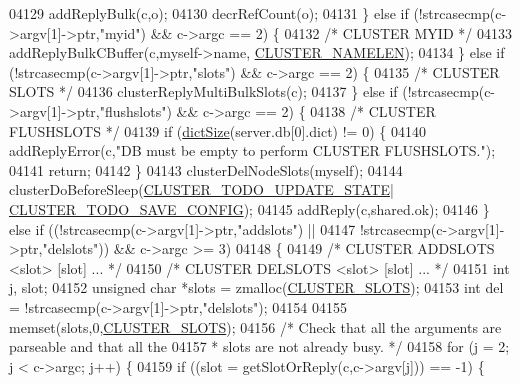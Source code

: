 \begin{DoxyCode}
{{{{{{{{{{{{{{{{{{{{{{{{{{{{{{{{{{{{{{{{{{{{{{{{{{{{{{{{{{{{{{{{{{{{{{{{{{04129         addReplyBulk(c,o);
04130         decrRefCount(o);
04131     \} \textcolor{keywordflow}{else} \textcolor{keywordflow}{if} (!strcasecmp(c->argv[1]->ptr,\textcolor{stringliteral}{"myid"}) && c->argc == 2) \{
04132         \textcolor{comment}{/* CLUSTER MYID */}
04133         addReplyBulkCBuffer(c,myself->name, \hyperlink{cluster_8h_ace7a882972eff7149675252938643b6e}{CLUSTER\_NAMELEN});
04134     \} \textcolor{keywordflow}{else} \textcolor{keywordflow}{if} (!strcasecmp(c->argv[1]->ptr,\textcolor{stringliteral}{"slots"}) && c->argc == 2) \{
04135         \textcolor{comment}{/* CLUSTER SLOTS */}
04136         clusterReplyMultiBulkSlots(c);
04137     \} \textcolor{keywordflow}{else} \textcolor{keywordflow}{if} (!strcasecmp(c->argv[1]->ptr,\textcolor{stringliteral}{"flushslots"}) && c->argc == 2) \{
04138         \textcolor{comment}{/* CLUSTER FLUSHSLOTS */}
04139         \textcolor{keywordflow}{if} (\hyperlink{dict_8h_af193430dd3d5579a52b194512f72c1f0}{dictSize}(server.db[0].dict) != 0) \{
04140             addReplyError(c,\textcolor{stringliteral}{"DB must be empty to perform CLUSTER FLUSHSLOTS."});
04141             \textcolor{keywordflow}{return};
04142         \}
04143         clusterDelNodeSlots(myself);
04144         clusterDoBeforeSleep(\hyperlink{cluster_8h_abea0d393cba342261e4a7e6fb745f388}{CLUSTER\_TODO\_UPDATE\_STATE}|
      \hyperlink{cluster_8h_a0ae5ff08fbae3c655012b4de8bfc327d}{CLUSTER\_TODO\_SAVE\_CONFIG});
04145         addReply(c,shared.ok);
04146     \} \textcolor{keywordflow}{else} \textcolor{keywordflow}{if} ((!strcasecmp(c->argv[1]->ptr,\textcolor{stringliteral}{"addslots"}) ||
04147                !strcasecmp(c->argv[1]->ptr,\textcolor{stringliteral}{"delslots"})) && c->argc >= 3)
04148     \{
04149         \textcolor{comment}{/* CLUSTER ADDSLOTS <slot> [slot] ... */}
04150         \textcolor{comment}{/* CLUSTER DELSLOTS <slot> [slot] ... */}
04151         \textcolor{keywordtype}{int} j, slot;
04152         \textcolor{keywordtype}{unsigned} \textcolor{keywordtype}{char} *slots = zmalloc(\hyperlink{cluster_8h_aa3e2cb951eebb16725ecc3f5beefd9fd}{CLUSTER\_SLOTS});
04153         \textcolor{keywordtype}{int} del = !strcasecmp(c->argv[1]->ptr,\textcolor{stringliteral}{"delslots"});
04154 
04155         memset(slots,0,\hyperlink{cluster_8h_aa3e2cb951eebb16725ecc3f5beefd9fd}{CLUSTER\_SLOTS});
04156         \textcolor{comment}{/* Check that all the arguments are parseable and that all the}
04157 \textcolor{comment}{         * slots are not already busy. */}
04158         \textcolor{keywordflow}{for} (j = 2; j < c->argc; j++) \{
04159             \textcolor{keywordflow}{if} ((slot = getSlotOrReply(c,c->argv[j])) == -1) \{
}}}}}}}}}}}}}}}}}}}}}}}}}}}}}}}}}}}}}}}}}}}}}}}}}}}}}}}}}}}}}}}}}}}}}}}}}}
\end{DoxyCode}
